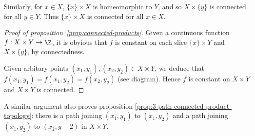 Similarly, for $x\in X$, $\{x\} \times X$ is homeomorphic to $Y$, and so $X \times \{y\}$ is connected for all $y\in Y$. Thus $\{x\} \times X$ is connected for all $x\in X$.

\begin{proof}
	[Proof of proposition~\ref{prop:connected-products}] Given a continuous function $f:X \times Y \to \Z$, it is obvious that $f$ is constant on each slice $\{x\} \times Y$ and $X \times \{y\}$, by connectedness.

	\begin{center}
	\end{center}

	Given arbitary points $(x_1,y_1), (x_2,y_2) \in X\times Y$, we deduce that $f(x_1,y_1) = f(x_1,y_2) = f(x_2,y_2)$ (see diagram). Hence $f$ is constant on $X\times Y$ and $X\times Y$ is connected.
\end{proof}

\vspace{3pt}

\begin{remark}
	A similar argument also proves proposition \ref{prop:3-path-connected-product-topology}: there is a path joining $(x_1,y_1)$ to $(x_1,y_2)$ and a path joining $(x_1,y_2)$ to $(x_2,y-2)$ in $X\times Y$.
\end{remark}


